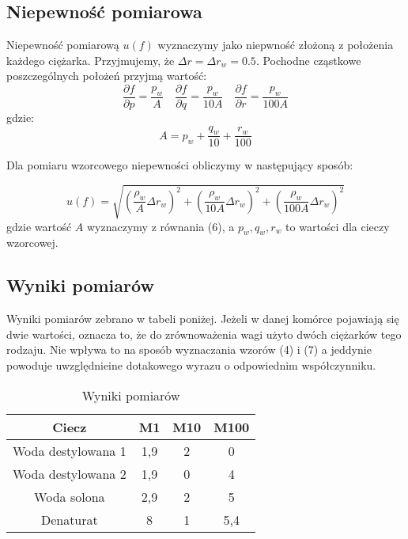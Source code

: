 \documentclass{article} %
\begin{document}
\subsection{Niepewność pomiarowa}

Niepewność pomiarową $u(f)$ wyznaczymy jako niepwność złożoną z położenia każdego ciężarka. Przyjmujemy, że $\Delta r = \Delta r_w = 0.5$. Pochodne cząstkowe poszczególnych położeń przyjmą wartość:
{\
    \begin{equation}
        \frac{\partial f}{\partial p} = \frac{p_w}{A}
        \quad\frac{\partial f}{\partial q} = \frac{p_w}{10A}
        \quad\frac{\partial f}{\partial r} = \frac{p_w}{100A}
    \end{equation}
}
gdzie:
{\
    \begin{equation}
        A = p_w + \frac{q_w}{10} + \frac{r_w}{100}
    \end{equation}
}

Dla pomiaru wzorcowego niepewności obliczymy w następujący sposób:

{\large
    \begin{equation}
        u(f) = \sqrt{(\frac{\rho_w}{A}\Delta r_w)^2+(\frac{\rho_w}{10A}\Delta r_w)^2+(\frac{\rho_w}{100A}\Delta r_w)^2}
    \end{equation}
}
gdzie wartość $A$ wyznaczymy z równania (6), a $p_w, q_w, r_w$ to wartości dla cieczy wzorcowej.
\subsection{Wyniki pomiarów}
Wyniki pomiarów zebrano w tabeli poniżej. Jeżeli w danej komórce pojawiają się dwie wartości, oznacza to, że do zrównoważenia wagi użyto dwóch ciężarków tego rodzaju. Nie wpływa to na sposób wyznaczania wzorów (4) i (7) a jeddynie powoduje uwzględnieine dotakowego wyrazu o odpowiednim współczynniku.

\begin{table}[h!]
\centering
\begin{tabular}{|c|c|c|c|}
\hline
\textbf{Ciecz} & \textbf{M1} & \textbf{M10} & \textbf{M100} \\
\hline
Woda destylowana 1 & 1,9 & 2 & 0 \\
Woda destylowana 2 & 1,9 & 0 & 4 \\
Woda solona & 2,9 & 2 & 5 \\
Denaturat & 8 & 1 & 5,4 \\
\hline
\end{tabular}
\caption{Wyniki pomiarów}
\label{table:students}
\end{table}
\end{document}
